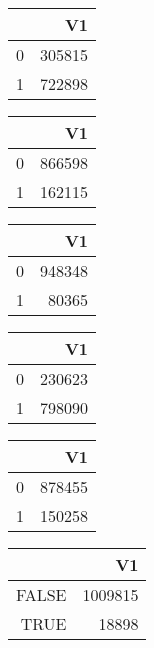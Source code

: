 \bigskip\bigskip
\centering
\begin{tabular}{rr}
  \hline
 & V1 \\ 
  \hline
0 & 305815 \\ 
  1 & 722898 \\ 
   \hline
\end{tabular}

\bigskip\bigskip
\centering
\begin{tabular}{rr}
  \hline
 & V1 \\ 
  \hline
0 & 866598 \\ 
  1 & 162115 \\ 
   \hline
\end{tabular}

\bigskip\bigskip
\centering
\begin{tabular}{rr}
  \hline
 & V1 \\ 
  \hline
0 & 948348 \\ 
  1 & 80365 \\ 
   \hline
\end{tabular}

\bigskip\bigskip
\centering
\begin{tabular}{rr}
  \hline
 & V1 \\ 
  \hline
0 & 230623 \\ 
  1 & 798090 \\ 
   \hline
\end{tabular}

\bigskip\bigskip
\centering
\begin{tabular}{rr}
  \hline
 & V1 \\ 
  \hline
0 & 878455 \\ 
  1 & 150258 \\ 
   \hline
\end{tabular}

\bigskip\bigskip
\centering
\begin{tabular}{rr}
  \hline
 & V1 \\ 
  \hline
FALSE & 1009815 \\ 
  TRUE & 18898 \\ 
   \hline
\end{tabular}

